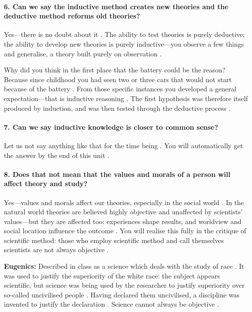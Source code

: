 \paragraph{6. Can we say the inductive method creates new theories and the deductive method reforms old theories?}
Yes---there is no doubt about it . The ability to test theories is purely deductive; the ability to develop new theories is purely inductive---you observe a few things and generalise, a theory built purely on observation .

\begin{ExampleBox}
Why did you think in the first place that the battery could be the reason? Because since childhood you had seen two or three cars that would not start because of the battery . From those specific instances you developed a general expectation---that is inductive reasoning . The first hypothesis was therefore itself produced by induction, and was then tested through the deductive process .
\end{ExampleBox}

\paragraph{7. Can we say inductive knowledge is closer to common sense?}
Let us not say anything like that for the time being . You will automatically get the answer by the end of this unit .

\paragraph{8. Does that not mean that the values and morals of a person will affect theory and study?}
Yes---values and morals affect our theories, especially in the social world . In the natural world theories are believed highly objective and unaffected by scientists' values---but they are affected too: experiences shape results, and worldview and social location influence the outcome . You will realise this fully in the critique of scientific method: those who employ scientific method and call themselves scientists are not always objective .

\begin{ExampleBox}
\textbf{Eugenics:} Described in class as a science which deals with the study of race . It was used to justify the superiority of the white race: the subject appears scientific, but science was being used by the researcher to justify superiority over so-called uncivilised people . Having declared them uncivilised, a discipline was invented to justify the declaration . Science cannot always be objective .
\end{ExampleBox}

